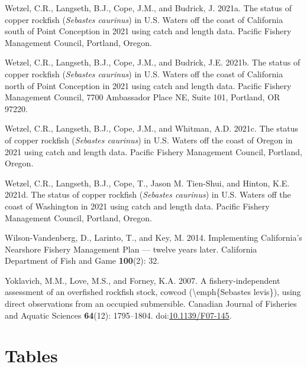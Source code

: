 \documentclass[11pt,
  english,
  letterpaper,
]{article}
\newlength{\cslhangindent}
\newenvironment{CSLReferences}[2] %
 {%
  \setlength{\parindent}{0pt}
  \ifodd #1 \everypar{\setlength{\hangindent}{\cslhangindent}}\ignorespaces\fi
  \ifnum #2 > 0
  \setlength{\parskip}{#2\baselineskip}
  \fi
 }%
 {}
\begin{document}
\begin{CSLReferences}{1}{0}
\leavevmode{}%
Wetzel, C.R., Langseth, B.J., Cope, J.M., and Budrick, J. 2021a. The status of copper rockfish (\emph{{Sebastes} caurinus}) in {U}.{S}. Waters off the coast of {California} south of {Point} {Conception} in 2021 using catch and length data. Pacific Fishery Management Council, Portland, Oregon.

\leavevmode{}%
Wetzel, C.R., Langseth, B.J., Cope, J.M., and Budrick, J.E. 2021b. The status of copper rockfish (\emph{{Sebastes} caurinus}) in {U}.{S}. Waters off the coast of {California} north of {Point} {Conception} in 2021 using catch and length data. Pacific Fishery Management Council, 7700 Ambassador Place NE, Suite 101, Portland, OR 97220.

\leavevmode{}%
Wetzel, C.R., Langseth, B.J., Cope, J.M., and Whitman, A.D. 2021c. The status of copper rockfish (\emph{{Sebastes} caurinus}) in {U}.{S}. Waters off the coast of {Oregon} in 2021 using catch and length data. Pacific Fishery Management Council, Portland, Oregon.

\leavevmode{}%
Wetzel, C.R., Langseth, B.J., Cope, T., Jason M. Tien-Shui, and Hinton, K.E. 2021d. The status of copper rockfish (\emph{{Sebastes} caurinus}) in {U}.{S}. Waters off the coast of {Washington} in 2021 using catch and length data. Pacific Fishery Management Council, Portland, Oregon.

\leavevmode{}%
Wilson-Vandenberg, D., Larinto, T., and Key, M. 2014. Implementing {California}'s {Nearshore} {Fishery} {Management} {Plan} --- twelve years later. California Department of Fish and Game \textbf{100}(2): 32.

\leavevmode{}%
Yoklavich, M.M., Love, M.S., and Forney, K.A. 2007. A fishery-independent assessment of an overfished rockfish stock, cowcod ({\textbackslash{}}emph\{{Sebastes} levis\}), using direct observations from an occupied submersible. Canadian Journal of Fisheries and Aquatic Sciences \textbf{64}(12): 1795--1804. doi:\href{https://doi.org/10.1139/F07-145}{10.1139/F07-145}.

\end{CSLReferences}

\clearpage

\hypertarget{tables}{%
\section{Tables}\label{tables}}
\end{document}
